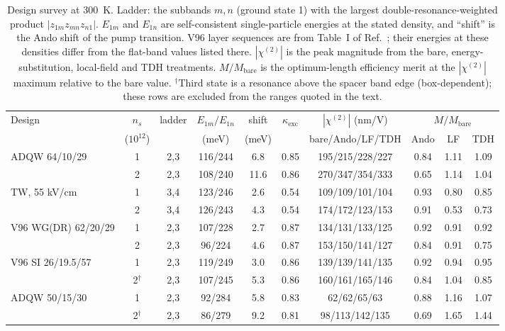 \documentclass[11pt]{article}
\newcommand{\chitwo}{\chi^{(2)}}
\begin{document}
\begin{table}[!t]\centering\small
\caption{Design survey at 300~K. Ladder: the subbands $m,n$ (ground state 1) with the largest double-resonance-weighted product $|z_{1m}z_{mn}z_{n1}|$. $E_{1m}$ and $E_{1n}$ are self-consistent single-particle energies at the stated density, and ``shift'' is the Ando shift of the pump transition. V96 layer sequences are from Table~I of Ref.~\cite{Vurgaftman1996}; their energies at these densities differ from the flat-band values listed there. $|\chitwo|$ is the peak magnitude from the bare, energy-substitution, local-field and TDH treatments. $M/M_\mathrm{bare}$ is the optimum-length efficiency merit at the $|\chitwo|$ maximum relative to the bare value. $^\dagger$Third state is a resonance above the spacer band edge (box-dependent); these rows are excluded from the ranges quoted in the text.}
\label{tab:survey}
\setlength{\tabcolsep}{3.5pt}
\begin{tabular}{lccccccccc}
\toprule
Design & $n_s$ & ladder & $E_{1m}/E_{1n}$ & shift & $\kappa_\mathrm{exc}$ & $|\chitwo|$ (nm/V) & \multicolumn{3}{c}{$M/M_\mathrm{bare}$}\\
& ($10^{12}$) & & (meV) & (meV) & & bare/Ando/LF/TDH & Ando & LF & TDH\\
\midrule
ADQW 64/10/29 & 1 & 2,3 & 116/244 & 6.8 & 0.85 & 195/215/228/227 & 0.84 & 1.11 & 1.09 \\
 & 2 & 2,3 & 108/240 & 11.6 & 0.86 & 270/347/354/333 & 0.65 & 1.14 & 1.04 \\
TW, 55 kV/cm & 1 & 3,4 & 123/246 & 2.6 & 0.54 & 109/109/101/104 & 0.93 & 0.80 & 0.85 \\
 & 2 & 3,4 & 126/243 & 4.3 & 0.54 & 174/172/123/153 & 0.91 & 0.53 & 0.73 \\
V96 WG(DR) 62/20/29 & 1 & 2,3 & 107/228 & 2.7 & 0.87 & 134/131/133/125 & 0.92 & 0.91 & 0.92 \\
 & 2 & 2,3 & 96/224 & 4.6 & 0.87 & 153/150/141/127 & 0.84 & 0.91 & 0.75 \\
V96 SI 26/19.5/57 & 1 & 2,3 & 119/249 & 3.0 & 0.86 & 139/139/141/135 & 0.92 & 0.94 & 0.95 \\
 & 2$^\dagger$ & 2,3 & 107/245 & 5.3 & 0.86 & 160/161/165/146 & 0.84 & 1.04 & 0.85 \\
ADQW 50/15/30 & 1 & 2,3 & 92/284 & 5.8 & 0.83 & 62/62/65/63 & 0.88 & 1.16 & 1.07 \\
 & 2$^\dagger$ & 2,3 & 86/279 & 9.2 & 0.81 & 98/113/142/135 & 0.69 & 1.65 & 1.44 \\
\bottomrule
\end{tabular}
\end{table}
\end{document}
